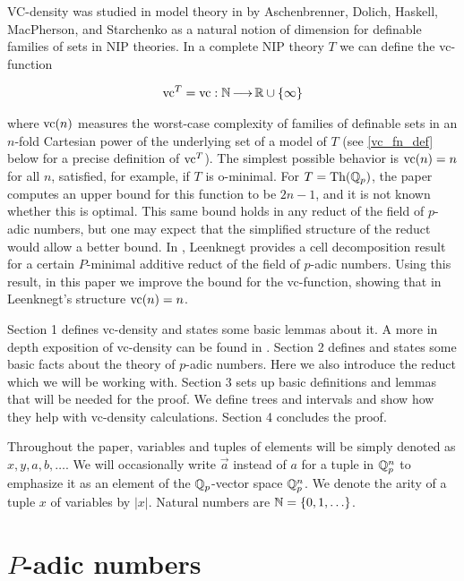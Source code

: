 VC-density was studied in model theory in \cite{density} by Aschenbrenner, Dolich, Haskell, MacPherson, and Starchenko
as a natural notion of dimension for definable families of sets in NIP theories.
In a complete NIP theory $T$ we can define the vc-function

\begin{align*}
  \operatorname{vc}^T = \operatorname{vc} : \mathbb{N} \operatorname{\longrightarrow} \mathbb{R} \cup \left\{\infty\right\}
\end{align*}

where $\operatorname{vc}(n)$ measures the worst-case complexity of families of definable sets in an $n$-fold Cartesian power of the underlying set of a model of $T$
(see \ref{vc_fn_def} below for a precise definition of $\operatorname{vc}^T$).
The simplest possible behavior is $\operatorname{vc}(n) = n$ for all $n$,
satisfied, for example, if $T$ is o-minimal.
For $T = \operatorname{Th}(\mathbb{Q}_p)$, the paper \cite{density} computes an upper bound for this function to be $2n-1$, and it is not known whether this is optimal.
This same bound holds in any reduct of the field of $p$-adic numbers, but one may expect that the simplified structure of the reduct would allow a better bound.
In \cite{reduct}, Leenknegt provides a cell decomposition result for a certain $P$-minimal additive reduct of the field of $p$-adic numbers.
Using this result, in this paper we improve the bound for the vc-function, showing that in Leenknegt's structure $\operatorname{vc}(n) = n$.

Section 1 defines vc-density and states some basic lemmas about it.
A more in depth exposition of vc-density can be found in \cite{density}.
Section 2 defines and states some basic facts about the theory of $p$-adic numbers.
Here we also introduce the reduct which we will be working with.
Section 3 sets up basic definitions and lemmas that will be needed for the proof.
We define trees and intervals and show how they help with vc-density calculations.
Section 4 concludes the proof.

Throughout the paper, variables and tuples of elements will be simply denoted as $x, y, a, b, \ldots$.
We will occasionally write $\vec a$ instead of $a$ for a tuple in $\mathbb{Q}_p^n$ to emphasize it as an element of the $\mathbb{Q}_p$-vector space $\mathbb{Q}_p^n$.
We denote the arity of a tuple $x$ of variables by $|x|$.
Natural numbers are $\mathbb{N} = \left\{0, 1, \ldots\right\}$.



\section{$P$-adic numbers}

